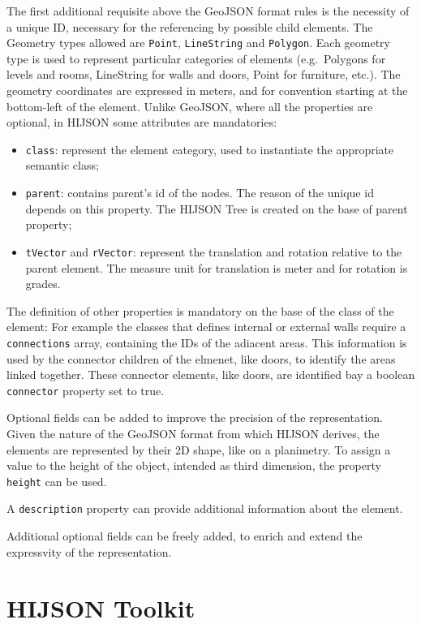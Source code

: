 \documentclass[]{article}
\begin{document}
The first additional requisite above the GeoJSON format rules is the
necessity of a unique ID, necessary for the referencing by possible
child elements. The Geometry types allowed are \texttt{Point},
\texttt{LineString} and \texttt{Polygon}. Each geometry type is used to
represent particular categories of elements (e.g.~Polygons for levels
and rooms, LineString for walls and doors, Point for furniture, etc.).
The geometry coordinates are expressed in meters, and for convention
starting at the bottom-left of the element. Unlike GeoJSON, where all
the properties are optional, in HIJSON some attributes are mandatories:

\begin{itemize}
\itemsep1pt\parskip0pt
\item
  \texttt{class}: represent the element category, used to instantiate
  the appropriate semantic class;
\item
  \texttt{parent}: contains parent's id of the nodes. The reason of the
  unique id depends on this property. The HIJSON Tree is created on the
  base of parent property;
\item
  \texttt{tVector} and \texttt{rVector}: represent the translation and
  rotation relative to the parent element. The measure unit for
  translation is meter and for rotation is grades.
\end{itemize}

The definition of other properties is mandatory on the base of the class
of the element: For example the classes that defines internal or
external walls require a \texttt{connections} array, containing the IDs
of the adiacent areas. This information is used by the connector
children of the elmenet, like doors, to identify the areas linked
together. These connector elements, like doors, are identified bay a
boolean \texttt{connector} property set to true.

Optional fields can be added to improve the precision of the
representation. Given the nature of the GeoJSON format from which HIJSON
derives, the elements are represented by their 2D shape, like on a
planimetry. To assign a value to the height of the object, intended as
third dimension, the property \texttt{height} can be used.

A \texttt{description} property can provide additional information about
the element.

Additional optional fields can be freely added, to enrich and extend the
expressvity of the representation.

\section{HIJSON Toolkit}\label{hijson-toolkit}
\end{document}
